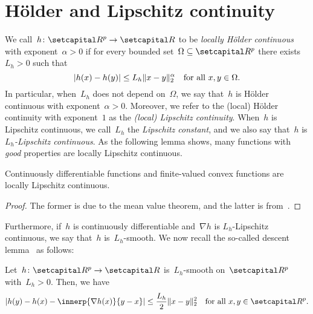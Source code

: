 \documentclass[../main]{subfiles}
\begin{document}
\section{H\"older and Lipschitz continuity}
We call~$h \colon \setR^p \to \setR$ to be \emph{locally H\"older continuous} with exponent~$\alpha > 0$ if for every bounded set~$\Omega \subseteq \setR^p$ there exists~$L_h > 0$ such that
\begin{equation}
    \lvert h(x) - h(y)\rvert \le L_h \lVert x - y\rVert_2^\alpha \quad \text{for all~$x, y \in \Omega$}
.\end{equation} 
In particular, when~$L_h$ does not depend on~$\Omega$, we say that~$h$ is H\"older continuous with exponent~$\alpha > 0$.
Moreover, we refer to the (local) H\"older continuity with exponent~$1$ as the \emph{(local) Lipschitz continuity}.
When~$h$ is Lipschitz continuous, we call~$L_h$ the \emph{Lipschitz constant}, and we also say that~$h$ is \emph{$L_h$-Lipschitz continuous}.
As the following lemma shows, many functions with \emph{good} properties are locally Lipschitz continuous.
\begin{lemma} 
    Continuously differentiable functions and finite-valued convex functions are locally Lipschitz continuous.
\end{lemma}
\begin{proof}
    The former is due to the mean value theorem, and the latter is from~\cite{WayneStateUniversity1972}.
\end{proof}

Furthermore, if~$h$ is continuously differentiable and~$\nabla h$ is $L_h$-Lipschitz continuous, we say that~$h$ is~$L_h$-smooth.
We now recall the so-called descent lemma~\cite[Proposition A.24]{Bertsekas1999} as follows:
\begin{lemma} 
    Let~$h \colon \setR^p \to \setR$ is~$L_h$-smooth on~$\setR^p$ with~$L_h > 0$.
    Then, we have
    \begin{equation}
        \abs{h(y) - h(x) - \innerp{\nabla h(x)}{y - x}} \le \frac{L_h}{2} \norm{x - y}_2^2 \forallcondition{x, y \in \setR^p}
    .\end{equation} 
\end{lemma}
\end{document}
